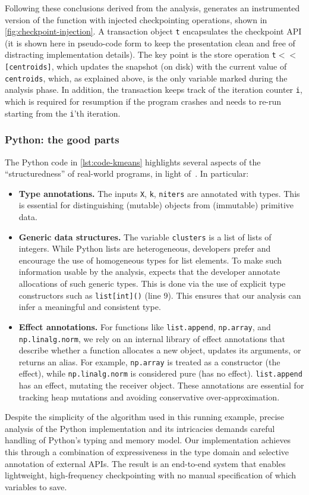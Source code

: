 Following these conclusions derived from the analysis, \spyte generates an instrumented version of the function
with injected checkpointing operations, shown in \cref{fig:checkpoint-injection}.
A transaction object \lstinline|t| encapsulates the checkpoint API (it is shown here in pseudo-code form to keep the presentation clean and free of distracting implementation details).
The key point is the store operation \lstinline|t|$<\!<$\lstinline|[centroids]|, which updates the snapshot (on disk) with the current value of \lstinline|centroids|, which,
as explained above, is the only variable marked during the analysis phase.
In addition, the transaction keeps track of the iteration counter \lstinline|i|, which is required for resumption if the program crashes and needs to re-run starting from the \lstinline|i|'th iteration.


\subsubsection*{Python: the good parts}

The Python code in \cref{lst:code-kmeans} highlights
several aspects of the ``structuredness'' of real-world 
programs, in light of~\citet{bence2021unambiguity}.
In particular:
\begin{itemize}
  \item \textbf{Type annotations.} The inputs \lstinline|X|, \lstinline|k|, \lstinline|niters| are annotated with types.
This is essential for distinguishing (mutable) objects from (immutable) primitive data.
  \item \textbf{Generic data structures.} The variable \texttt{clusters} is a list of lists of integers. 
While Python lists are heterogeneous, developers prefer and encourage the use of homogeneous types for list elements.
To make such information usable by the analysis, \spyte
expects that the developer annotate allocations of such
generic types.
This is done via the use of explicit type constructors
such as \texttt{list[int]()} (line 9).
This ensures that our analysis can infer a meaningful and consistent type.
    \item \textbf{Effect annotations.} For functions like \lstinline|list.append|, \lstinline|np.array|, and \lstinline|np.linalg.norm|, we rely on an internal library of effect annotations that describe whether a function allocates a new object, updates its arguments, or returns an alias.
For example, \lstinline|np.array| is treated as a constructor (the \tnew effect), while \lstinline|np.linalg.norm| is considered pure (has no effect).
\lstinline|list.append| has an \tupdate effect, mutating the receiver object.
These annotations are essential for tracking heap mutations and avoiding conservative over-approximation.
\end{itemize}

Despite the simplicity of the algorithm used in this running example, precise analysis of the Python implementation and its intricacies demands careful handling of Python's typing and memory model.
Our implementation achieves this through a combination of expressiveness in the type domain and selective annotation of external APIs. The result is an end-to-end system that enables lightweight, high-frequency checkpointing with no manual specification of which variables to save.
